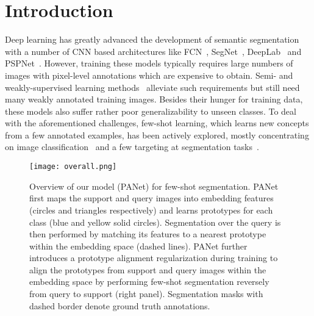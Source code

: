 \documentclass[10pt,twocolumn,letterpaper]{article}
\begin{document}
\section{Introduction}

Deep learning has greatly advanced the development of semantic segmentation with a number of CNN based architectures like FCN~\cite{long2015fully}, SegNet~\cite{badrinarayanan2017segnet}, DeepLab~\cite{chen2018deeplab} and PSPNet~\cite{zhao2017pyramid}. However, training these models typically requires large numbers of images with pixel-level annotations which are expensive to obtain. Semi- and weakly-supervised learning methods~\cite{wei2017object, dai2015boxsup, lin2016scribblesup, papandreou2015weakly} alleviate such requirements but still need many weakly annotated training images. Besides their hunger for training data, these models also suffer rather poor generalizability to unseen classes. To deal with the aforementioned challenges, few-shot learning, which learns new concepts from a few annotated examples, has been actively explored, mostly concentrating on image classification~\cite{vinyals2016matching, snell2017prototypical, sung2018learning, ravi2016optimization, finn2017model, garcia2018fewshot, liu2018learning, oreshkin2018tadam} and a few targeting at segmentation tasks~\cite{shaban2017one, rakelly2018few, dong2018few, zhang2018sg, dong2018few, Hu2018AttentionbasedMG}. 

\begin{figure}[t]
\begin{center}
   \texttt{[image: overall.png]}
\end{center}
   \caption{Overview of our model (PANet) for few-shot segmentation. PANet first maps the support and query images into embedding features (circles and triangles respectively) and learns prototypes for each class (blue and yellow solid circles). Segmentation over the query is then performed by matching its features to a nearest prototype within the embedding space (dashed lines). PANet further introduces a prototype alignment regularization during training to align the prototypes from support and query images within the embedding space by performing few-shot segmentation reversely from query to support (right panel). Segmentation masks with dashed border denote ground truth annotations.
   }
\label{fig:overall}
\end{figure}
\end{document}
